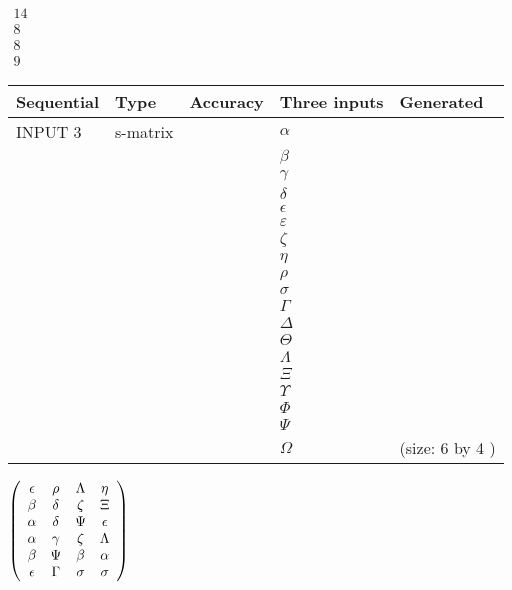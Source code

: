 \documentclass[12pt]{article}
\begin{document}
   
 $\begin{array}{
 c
 }
          14  \\ 
           8  \\ 
           8  \\ 
           9
\end{array}  $ 
  
  
\noindent\begin{tabular}{|l|l|l|l|l|}
\hline
 Sequential & Type & Accuracy & Three inputs & Generated \\ 
\hline
 
 
  INPUT $            3 $ & s-matrix & & 
 $  \alpha $ & 
  \\
  & & & 
 $  \beta $ & 
  \\
  & & & 
 $  \gamma $ & 
  \\
  & & & 
 $  \delta $ & 
  \\
  & & & 
 $  \epsilon $ & 
  \\
  & & & 
 $  \varepsilon $ & 
  \\
  & & & 
 $                     \zeta $ & 
  \\
  & & & 
 $  \eta $ & 
  \\
  & & & 
 $  \rho $ & 
  \\
  & & & 
 $  \sigma $ & 
  \\
  & & & 
 $  \Gamma $ & 
  \\
  & & & 
 $  \Delta $ & 
  \\
  & & & 
 $  \Theta $ & 
  \\
  & & & 
 $  \Lambda $ & 
  \\
  & & & 
 $                     \Xi $ & 
  \\
  & & & 
 $  \Upsilon $ & 
  \\
  & & & 
 $  \Phi $ & 
  \\
  & & & 
 $  \Psi $ & 
  \\
  & & & 
 $  \Omega $ & 
  (size:            6  by            4 )
 \\  \hline  
 \end{tabular}
   
   
 $  \left( \begin{array}
 {
 c
 c
 c
 c
 }
 \epsilon & 
 \rho & 
 \Lambda & 
 \eta \\ 
 \beta & 
 \delta & 
                    \zeta & 
                    \Xi \\ 
 \alpha & 
 \delta & 
 \Psi & 
 \epsilon \\ 
 \alpha & 
 \gamma & 
                    \zeta & 
 \Lambda \\ 
 \beta & 
 \Psi & 
 \beta & 
 \alpha \\ 
 \epsilon & 
 \Gamma & 
 \sigma & 
 \sigma
 \end{array} \right) $ 
  
\end{document}

